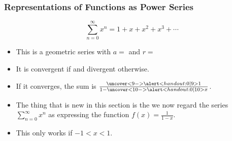 \begin{frame}
\frametitle{Representations of Functions as Power Series}
\[
\sum_{n=0}^\infty x^n = 1 + x + x^2 + x^3 + \cdots 
\]
\begin{itemize}
\item<2->  This is a geometric series with \alert<handout:0| 2-3,9>{$a = $ } and \alert<handout:0| 4-5,10>{$r = $ }
\item<6->  It is convergent if  and divergent otherwise.
\item<8->  If it converges, the sum is $\frac{\uncover<9->{\alert<handout:0| 9>{1}}}{1 - \uncover<10->{\alert<handout:0| 10>{x}}}$.
\item<11->  The thing that is new in this section is the we now regard the series $\sum_{n=0}^\infty x^n$ as expressing the function $f(x) = \frac{1}{1-x}$.
\item<12->  This only works if $-1 < x < 1$.
\end{itemize}
\end{frame}
